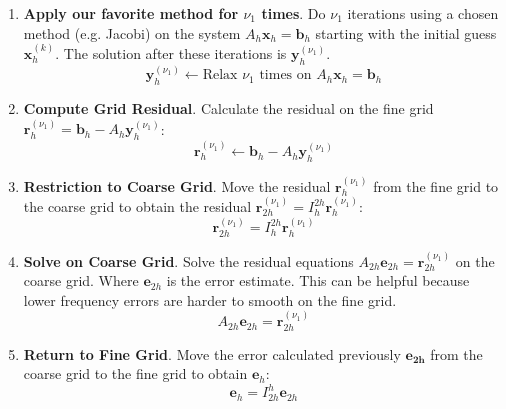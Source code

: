 \begin{enumerate}
    \item \textbf{Apply our favorite method for $\nu_{1}$ times}. Do $\nu_{1}$ iterations using a chosen method (e.g. Jacobi) on the system $A_{h}\mathbf{x}_{h} = \mathbf{b}_{h}$ starting with the initial guess $\mathbf{x}_{h}^{\left(k\right)}$. The solution after these iterations is $\mathbf{y}_{h}^{\left(\nu_{1}\right)}$.
    \begin{equation*}
        \mathbf{y}_{h}^{\left(\nu_{1}\right)} \leftarrow \text{Relax } \nu_{1} \text{ times on } A_{h}\mathbf{x}_{h} = \mathbf{b}_{h}
    \end{equation*}

    \item \textbf{Compute Grid Residual}. Calculate the residual on the fine grid $\mathbf{r}_{h}^{\left(\nu_{1}\right)} = \mathbf{b}_{h} - A_{h}\mathbf{y}_{h}^{\left(\nu_{1}\right)}$:
    \begin{equation*}
        \mathbf{r}_{h}^{\left(\nu_{1}\right)} \leftarrow \mathbf{b}_{h} - A_{h}\mathbf{y}_{h}^{\left(\nu_{1}\right)}
    \end{equation*}

    \item \textbf{Restriction to Coarse Grid}. Move the residual $\mathbf{r}_{h}^{\left(\nu_{1}\right)}$ from the fine grid to the coarse grid to obtain the residual $\mathbf{r}_{2h}^{\left(\nu_{1}\right)} = I_{h}^{2h} \mathbf{r}_{h}^{\left(\nu_{1}\right)}$:
    \begin{equation*}
        \mathbf{r}_{2h}^{\left(\nu_{1}\right)} = I_{h}^{2h} \mathbf{r}_{h}^{\left(\nu_{1}\right)}
    \end{equation*}

    \item \textbf{Solve on Coarse Grid}. Solve the residual equations $A_{2h}\mathbf{e}_{2h} = \mathbf{r}_{2h}^{\left(\nu_{1}\right)}$ on the coarse grid. Where $\mathbf{e}_{2h}$ is the error estimate. This can be helpful because lower frequency errors are harder to smooth on the fine grid.
    \begin{equation}
        A_{2h}\mathbf{e}_{2h} = \mathbf{r}_{2h}^{\left(\nu_{1}\right)}
    \end{equation}

    \item \textbf{Return to Fine Grid}. Move the error calculated previously $\mathbf{e_{2h}}$ from the coarse grid to the fine grid to obtain $\mathbf{e}_{h}$:
    \begin{equation*}
        \mathbf{e}_{h} = I_{2h}^{h}\mathbf{e}_{2h}
    \end{equation*}


\end{enumerate}
